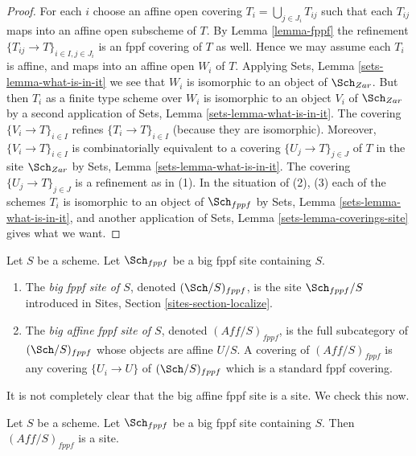 \begin{proof}
For each $i$ choose an affine open covering $T_i = \bigcup_{j \in J_i} T_{ij}$
such that each $T_{ij}$ maps into an affine open subscheme of $T$. By
Lemma \ref{lemma-fppf}
the refinement $\{T_{ij} \to T\}_{i \in I, j \in J_i}$ is an fppf covering
of $T$ as well. Hence we may assume each $T_i$ is affine, and maps into
an affine open $W_i$ of $T$. Applying
Sets, Lemma \ref{sets-lemma-what-is-in-it}
we see that $W_i$ is isomorphic to an object of $\Sch_{Zar}$.
But then $T_i$ as a finite type scheme over $W_i$
is isomorphic to an object $V_i$ of $\Sch_{Zar}$ by a second
application of
Sets, Lemma \ref{sets-lemma-what-is-in-it}.
The covering $\{V_i \to T\}_{i \in I}$ refines $\{T_i \to T\}_{i \in I}$
(because they are isomorphic).
Moreover, $\{V_i \to T\}_{i \in I}$ is combinatorially equivalent to a
covering $\{U_j \to T\}_{j \in J}$ of $T$ in the site
$\Sch_{Zar}$ by
Sets, Lemma \ref{sets-lemma-what-is-in-it}.
The covering $\{U_j \to T\}_{j \in J}$ is a refinement as in (1).
In the situation of (2), (3) each of the
schemes $T_i$ is isomorphic to an object of $\Sch_{fppf}$ by
Sets, Lemma \ref{sets-lemma-what-is-in-it},
and another application of
Sets, Lemma \ref{sets-lemma-coverings-site}
gives what we want.
\end{proof}

\begin{definition}
\label{definition-big-small-fppf}
Let $S$ be a scheme. Let $\Sch_{fppf}$ be a big fppf
site containing $S$.
\begin{enumerate}
\item The {\it big fppf site of $S$}, denoted
$(\Sch/S)_{fppf}$, is the site $\Sch_{fppf}/S$
introduced in Sites, Section \ref{sites-section-localize}.
\item The {\it big affine fppf site of $S$}, denoted
$(\textit{Aff}/S)_{fppf}$, is the full subcategory of
$(\Sch/S)_{fppf}$ whose objects are affine $U/S$.
A covering of $(\textit{Aff}/S)_{fppf}$ is any covering
$\{U_i \to U\}$ of $(\Sch/S)_{fppf}$ which is a
standard fppf covering.
\end{enumerate}
\end{definition}

\noindent
It is not completely clear that
the big affine fppf site is a site. We check this now.

\begin{lemma}
\label{lemma-verify-site-fppf}
Let $S$ be a scheme. Let $\Sch_{fppf}$ be a big fppf
site containing $S$. Then $(\textit{Aff}/S)_{fppf}$ is a site.
\end{lemma}

